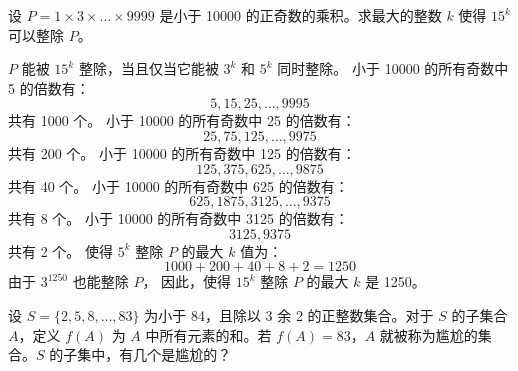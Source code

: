 \begin{questions}
\question
设 $P = 1 \times 3 \times \dots \times 9999$ 是小于 10000 的正奇数的乘积。求最大的整数 $k$ 使得 $15^k$ 可以整除 $P$。

\begin{solution}
$P$ 能被 $15^k$ 整除，当且仅当它能被 $3^k$ 和 $5^k$ 同时整除。
小于 10000 的所有奇数中 5 的倍数有：
\[
5, 15, 25, \dots, 9995
\]
共有 1000 个。
小于 10000 的所有奇数中 25 的倍数有：
\[
25, 75, 125, \dots, 9975
\]
共有 200 个。
小于 10000 的所有奇数中 125 的倍数有：
\[
125, 375, 625, \dots, 9875
\]
共有 40 个。
小于 10000 的所有奇数中 625 的倍数有：
\[
625, 1875, 3125, \dots, 9375
\]
共有 8 个。
小于 10000 的所有奇数中 3125 的倍数有：
\[
3125, 9375
\]
共有 2 个。
使得 $5^k$ 整除 $P$ 的最大 $k$ 值为：
\[
1000 + 200 + 40 + 8 + 2 = 1250
\]
由于 $3^{1250}$ 也能整除 $P$，
因此，使得 $15^k$ 整除 $P$ 的最大 $k$ 是 1250。
\end{solution}

\question
设 $S = \{2, 5, 8, \dots, 83\}$ 为小于 84，且除以 3 余 2 的正整数集合。对于 $S$ 的子集合 $A$，定义 $f(A)$ 为 $A$ 中所有元素的和。若 $f(A) = 83$，$A$ 就被称为尴尬的集合。$S$ 的子集中，有几个是尴尬的？


\end{questions}
